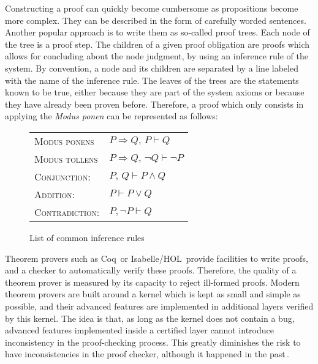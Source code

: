Constructing a proof can quickly become cumbersome as propositions become more
complex.
%
They can be described in the form of carefully worded sentences.
%
Another popular approach is to write them as so-called proof trees.
%
Each node of the tree is a proof step.
%
The children of a given proof obligation are proofs which allows for concluding
about the node judgment, by using an inference rule of the system.
%
By convention, a node and its children are separated by a line labeled with the
name of the inference rule.
%
The leaves of the trees are the statements known to be true, either because they
are part of the system axioms or because they have already been proven before.
%
Therefore, a proof which only consists in applying the \emph{Modus ponen} can be
represented as follows:
%
\begin{prooftree}
     
\end{prooftree}

\begin{figure}
  \begin{center}
    \begin{tabular}{ll}
      {\scshape Modus ponens} & \( P \Rightarrow Q\text{, }P \vdash Q \) \\
      {\scshape Modus tollens} &
                                 \( P \Rightarrow Q\text{, }\neg Q \vdash \neg P \) \\
      {\scshape Conjunction:} & \( P\text{, }Q \vdash P \wedge Q \) \\
      {\scshape Addition:} & \( P \vdash P \vee Q \) \\
      {\scshape Contradiction:} & \( P, \neg P \vdash Q \)
    \end{tabular}
  \end{center}

  \caption{List of common inference rules}
  \label{fig:sota:inference}
\end{figure}

Theorem provers such as Coq\,\cite{coq} or
Isabelle/HOL\,\cite{nipkow2002isabelle} provide facilities to write proofs, and
a checker to automatically verify these proofs.
%
Therefore, the quality of a theorem prover is measured by its capacity to reject
ill-formed proofs.
%
Modern theorem provers are built around a kernel which is kept as small and
simple as possible, and their advanced features are implemented in additional
layers verified by this kernel.
%
The idea is that, as long as the kernel does not contain a bug, advanced
features implemented inside a certified layer cannot introduce inconsistency in
the proof-checking process.
%
This greatly diminishes the risk to have inconsistencies in the proof checker,
although it happened in the
past\,\cite{claret2015falso,griffioen1998comparison}.

